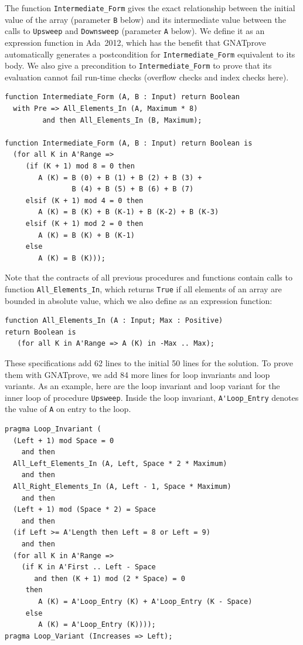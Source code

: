 \documentclass[sttt,final]{svjour}
\newcommand{\gnatprove}{GNATprove\xspace}
\newcommand{\adatwtw}{Ada~2012\xspace}
\begin{document}
%

The function \verb|Intermediate_Form| gives the exact relationship between the
initial value of the array (parameter \verb|B| below) and its intermediate
value between the calls to \verb|Upsweep| and \verb|Downsweep| (parameter
\verb|A| below). We define it as an expression function in \adatwtw, which has
the benefit that \gnatprove automatically generates a postcondition for
\verb|Intermediate_Form| equivalent to its body. We also give a precondition to
\verb|Intermediate_Form| to prove that its evaluation cannot fail run-time
checks (overflow checks and index checks here).
%
\begin{lstlisting}
function Intermediate_Form (A, B : Input) return Boolean
  with Pre => All_Elements_In (A, Maximum * 8)
         and then All_Elements_In (B, Maximum);

function Intermediate_Form (A, B : Input) return Boolean is
  (for all K in A'Range =>
     (if (K + 1) mod 8 = 0 then
        A (K) = B (0) + B (1) + B (2) + B (3) +
                B (4) + B (5) + B (6) + B (7)
     elsif (K + 1) mod 4 = 0 then
        A (K) = B (K) + B (K-1) + B (K-2) + B (K-3)
     elsif (K + 1) mod 2 = 0 then
        A (K) = B (K) + B (K-1)
     else
        A (K) = B (K)));
\end{lstlisting}
%

Note that the contracts of all previous procedures and functions contain calls
to function \verb|All_Elements_In|, which returns \verb|True| if all elements
of an array are bounded in absolute value, which we also define as an
expression function:
%
\begin{lstlisting}
function All_Elements_In (A : Input; Max : Positive)
return Boolean is
   (for all K in A'Range => A (K) in -Max .. Max);
\end{lstlisting}
%

These specifications add 62 lines to the initial 50 lines for the solution. To
prove them with \gnatprove, we add 84 more lines for loop invariants and loop
variants. As an example, here are the loop invariant and loop variant for the
inner loop of procedure \verb|Upsweep|. Inside the loop invariant,
\verb|A'Loop_Entry| denotes the value of \verb|A| on entry to the loop.
%
\begin{lstlisting}
pragma Loop_Invariant (
  (Left + 1) mod Space = 0
    and then
  All_Left_Elements_In (A, Left, Space * 2 * Maximum)
    and then
  All_Right_Elements_In (A, Left - 1, Space * Maximum)
    and then
  (Left + 1) mod (Space * 2) = Space
    and then
  (if Left >= A'Length then Left = 8 or Left = 9)
    and then
  (for all K in A'Range =>
    (if K in A'First .. Left - Space
       and then (K + 1) mod (2 * Space) = 0
     then
        A (K) = A'Loop_Entry (K) + A'Loop_Entry (K - Space)
     else
        A (K) = A'Loop_Entry (K))));
pragma Loop_Variant (Increases => Left);
\end{lstlisting}
%
\end{document}
